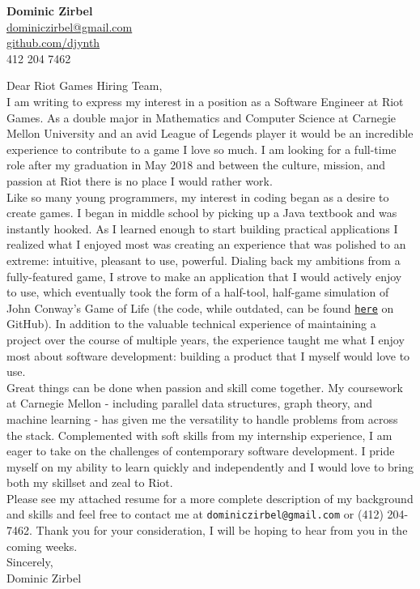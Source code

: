 \documentclass[letterpaper,10pt]{article}
\newcommand{\lb}{\vspace{14pt} \\}
\begin{document}
\thispagestyle{empty}

\begin{flushright}
    \textbf{\Large{Dominic Zirbel}} \\
    \href{mailto:dominiczirbel@gmail.com}{dominiczirbel@gmail.com} \\
    \href{https://github.com/djynth}{github.com/djynth} \\
    412 204 7462
\end{flushright}

\vspace{36pt}

Dear Riot Games Hiring Team,
\lb
I am writing to express my interest in a position as a Software Engineer at Riot Games. As a double major in Mathematics and Computer Science at Carnegie Mellon University and an avid League of Legends player it would be an incredible experience to contribute to a game I love so much. I am looking for a full-time role after my graduation in May 2018 and between the culture, mission, and passion at Riot there is no place I would rather work.
\lb
Like so many young programmers, my interest in coding began as a desire to create games. I began in middle school by picking up a Java textbook and was instantly hooked. As I learned enough to start building practical applications I realized what I enjoyed most was creating an experience that was polished to an extreme: intuitive, pleasant to use, powerful. Dialing back my ambitions from a fully-featured game, I strove to make an application that I would actively enjoy to use, which eventually took the form of a half-tool, half-game simulation of John Conway's Game of Life (the code, while outdated, can be found \href{https://github.com/djynth/Game-of-Life}{\texttt{here}} on GitHub). In addition to the valuable technical experience of maintaining a project over the course of multiple years, the experience taught me what I enjoy most about software development: building a product that I myself would love to use.
\lb
Great things can be done when passion and skill come together. My coursework at Carnegie Mellon - including parallel data structures, graph theory, and machine learning - has given me the versatility to handle problems from across the stack. Complemented with soft skills from my internship experience, I am eager to take on the challenges of contemporary software development. I pride myself on my ability to learn quickly and independently and I would love to bring both my skillset and zeal to Riot.
\lb
Please see my attached resume for a more complete description of my background and skills and feel free to contact me at \texttt{dominiczirbel@gmail.com} or (412) 204-7462. Thank you for your consideration, I will be hoping to hear from you in the coming weeks.
\lb
Sincerely, \\
Dominic Zirbel
\end{document}
